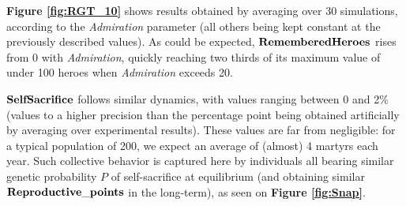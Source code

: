 \documentclass[a4paper,12pt]{report}
\begin{document}
\textbf{Figure \ref{fig:RGT_10}} shows results obtained by averaging over 30 simulations, according to the \emph{Admiration}
 parameter (all others being kept constant at the previously described values). As could be expected, $\bf{RememberedHeroes}$
 rises from 0 with \emph{Admiration}, quickly reaching two thirds of its maximum value of under 100 heroes when
 \emph{Admiration} exceeds 20. 
 
 $\bf{SelfSacrifice}$ follows similar dynamics, with values ranging between 0 and 2\% (values to a higher precision than
 the percentage point being obtained artificially by averaging over experimental results). These values are far from negligible:
 for a typical population of 200, we expect an average of (almost) 4 martyrs each year.
 Such collective behavior is captured here by individuals all bearing similar genetic probability $P$
 of self-sacrifice at equilibrium (and obtaining similar $\bf{Reproductive\_points}$ in the 
 long-term), as seen on \textbf{Figure \ref{fig:Snap}}. 
 
\end{document}
